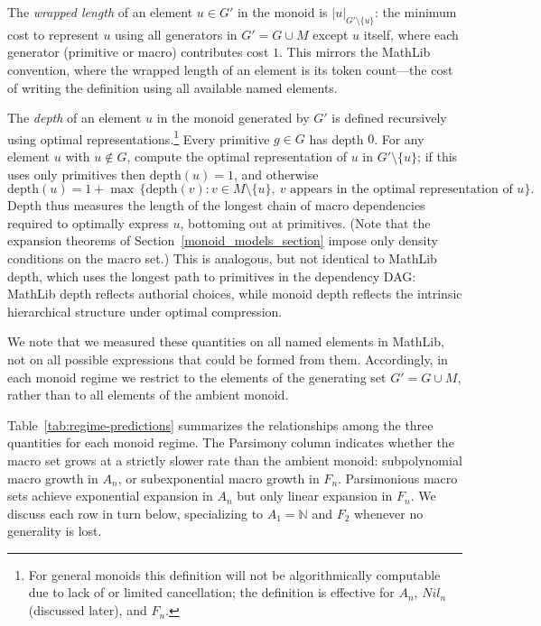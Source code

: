 \documentclass[12pt]{amsart}
\newcommand{\N}{\mathbb{N}}
\theoremstyle{definition}
\theoremstyle{remark}
\begin{document}
The \emph{wrapped length} of an element $u \in G'$ in the monoid is 
$|u|_{G' \setminus \{u\}}$: the minimum cost to represent $u$ using all 
generators in $G' = G \cup M$ except $u$ itself, where each generator 
(primitive or macro) contributes cost $1$. 
This mirrors the MathLib convention, where the wrapped length of an element is its token count---the cost of writing the definition using all 
available named elements.

The \emph{depth} of an element $u$ in the monoid generated by $G'$ is defined recursively using optimal representations.\footnote{For general monoids this definition will not be algorithmically computable due to lack of or limited cancellation; the definition is effective for $A_n$, $Nil_n$ (discussed later), and $F_n$.} 
Every primitive $g \in G$ has depth $0$. 
For any element $u$ with $u \notin G$, compute the optimal representation of $u$ in $G' \setminus \{u\}$; if this uses only primitives then $\mathrm{depth}(u) = 1$, and otherwise
\[
\mathrm{depth}(u) = 1 + \max\,\{\mathrm{depth}(v) : v \in M \setminus \{u\},\ 
v \text{ appears in the optimal representation of } u\}.
\]
Depth thus measures the length of the longest chain of macro dependencies required to optimally express $u$, bottoming out at primitives.
(Note that the expansion theorems of Section~\ref{monoid_models_section} impose only density conditions on the macro set.) 
This is analogous, but not identical to MathLib depth, which uses the longest path to primitives in the dependency DAG: 
MathLib depth reflects authorial choices, while monoid depth reflects the intrinsic hierarchical structure under optimal compression.

We note that we measured these quantities on all named elements in MathLib, not on all possible expressions that could be formed from them. 
Accordingly, in each monoid regime we restrict to the elements of the generating set $ G'= G \cup M$, rather than to all elements of the ambient monoid. 

Table~\ref{tab:regime-predictions} summarizes the relationships among the three quantities for each monoid regime.
The Parsimony column indicates whether the macro set grows at a strictly slower rate than the ambient monoid: subpolynomial macro growth in $A_n$, or subexponential macro growth in $F_n$.
Parsimonious macro sets achieve exponential expansion in $A_n$ but only linear expansion in $F_n$.
We discuss each row in turn below, specializing to $A_1 = \N$ and $F_2$ whenever no generality is lost.
\end{document}
